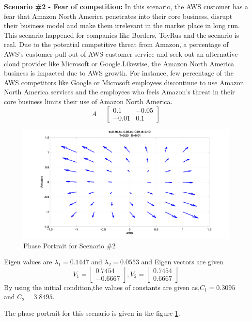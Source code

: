 \documentclass[fleqn,10pt]{SelfArx} %
\begin{document}
\textbf{Scenario \#2 - Fear of competition:}
In this scenario, the AWS customer has a fear that Amazon North America penetrates into their core business, disrupt their business model and make them irrelevant in the market place in long run. This scenario happened for companies like Borders, ToyRus and the scenario is real. Due to the potential competitive threat from Amazon, a percentage of AWS's customer pull out of AWS customer service and seek out an alternative cloud provider like Microsoft or Google.Likewise, the Amazon North America business is impacted due to AWS growth. For instance, few percentage of the AWS competitors like Google or Microsoft employees discontinue to use Amazon North America services and the employees who feels Amazon's threat in their core business limits their use of Amazon North America. 
\[
A =
\begin{bmatrix}
0.1 & -0.05 \\
-0.01 & 0.1
\end{bmatrix}
\]
\begin{figure}[ht]\centering
\includegraphics[width=\linewidth]{scen2}
\caption{Phase Portrait for Scenario \#2}
\label{fig:scen2}
\end{figure}  
Eigen values are $\lambda_1 = 0.1447$ and $\lambda_2 = 0.0553$ and Eigen vectors are given 
\[
V_1 =
\begin{bmatrix}
0.7454  \\
-0.6667 
\end{bmatrix}
,V_2 =
\begin{bmatrix}
0.7454  \\
0.6667
\end{bmatrix}
\]
By using the initial condition,the values of constants are given as,$C_1=0.3095$ and $C_2=3.8495$.

The phase portrait for this scenario is given in the figure \ref{fig:scen2}.
\end{document}
